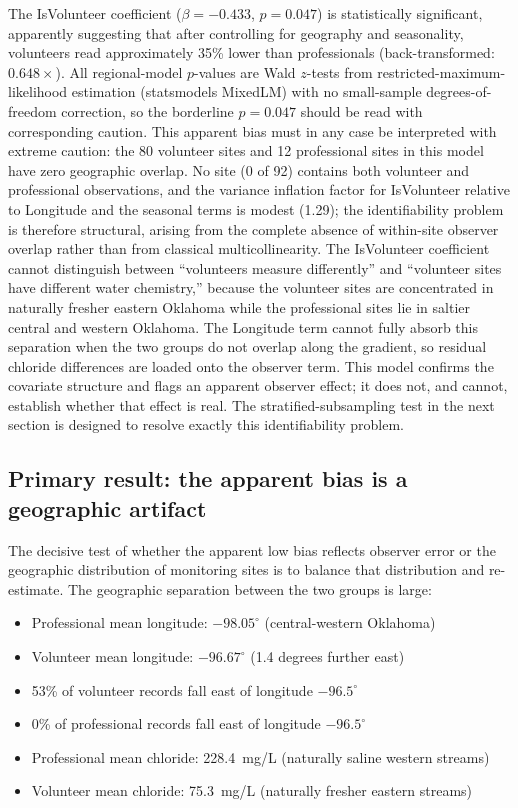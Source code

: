 \documentclass[lineno]{wlpeerj}
\begin{document}
The IsVolunteer coefficient ($\beta = -0.433$, $p = 0.047$) is statistically significant, apparently suggesting that after controlling for geography and seasonality, volunteers read approximately 35\% lower than professionals (back-transformed: $0.648\times$). All regional-model $p$-values are Wald $z$-tests from restricted-maximum-likelihood estimation (statsmodels MixedLM) with no small-sample degrees-of-freedom correction, so the borderline $p = 0.047$ should be read with corresponding caution. This apparent bias must in any case be interpreted with extreme caution: the 80 volunteer sites and 12 professional sites in this model have zero geographic overlap. No site (0 of 92) contains both volunteer and professional observations, and the variance inflation factor for IsVolunteer relative to Longitude and the seasonal terms is modest (1.29); the identifiability problem is therefore structural, arising from the complete absence of within-site observer overlap rather than from classical multicollinearity. The IsVolunteer coefficient cannot distinguish between ``volunteers measure differently'' and ``volunteer sites have different water chemistry,'' because the volunteer sites are concentrated in naturally fresher eastern Oklahoma while the professional sites lie in saltier central and western Oklahoma. The Longitude term cannot fully absorb this separation when the two groups do not overlap along the gradient, so residual chloride differences are loaded onto the observer term. This model confirms the covariate structure and flags an apparent observer effect; it does not, and cannot, establish whether that effect is real. The stratified-subsampling test in the next section is designed to resolve exactly this identifiability problem.

\subsection{Primary result: the apparent bias is a geographic artifact}
\label{sec:confound}

The decisive test of whether the apparent low bias reflects observer error or the geographic distribution of monitoring sites is to balance that distribution and re-estimate. The geographic separation between the two groups is large:

\begin{itemize}
  \item Professional mean longitude: $-98.05^{\circ}$ (central-western Oklahoma)
  \item Volunteer mean longitude: $-96.67^{\circ}$ (1.4 degrees further east)
  \item 53\% of volunteer records fall east of longitude $-96.5^{\circ}$
  \item 0\% of professional records fall east of longitude $-96.5^{\circ}$
  \item Professional mean chloride: 228.4~mg/L (naturally saline western streams)
  \item Volunteer mean chloride: 75.3~mg/L (naturally fresher eastern streams)
\end{itemize}
\end{document}
